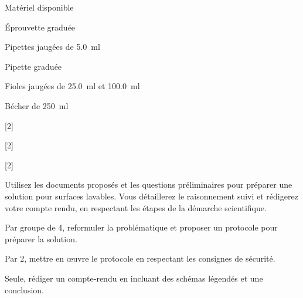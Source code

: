 \begin{doc}{Matériel disponible}
  \begin{listePoints}[2]
    \item Éprouvette graduée
    \item Pipettes jaugées de \qty{5,0}{\ml}
    \item Pipette graduée
    \item Fioles jaugées de \qty{25,0}{\ml} et \qty{100,0}{\ml}
    \item Bécher de \qty{250}{\ml}
  \end{listePoints}
\end{doc}

\vspace*{-8pt}

[2]

[2]

[2]



\mesure
Utilisez les documents proposés et les questions préliminaires pour préparer une solution pour surfaces lavables.
Vous détaillerez le raisonnement suivi et rédigerez votre compte rendu, en respectant les étapes de la démarche scientifique.
\begin{protocole}
  \item Par groupe de 4, reformuler la problématique et proposer un protocole pour préparer la solution.
  \item Par 2, mettre en œuvre le protocole en respectant les consignes de sécurité.
  \item Seule, rédiger un compte-rendu en incluant des schémas légendés et une conclusion.
\end{protocole}
